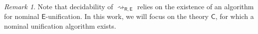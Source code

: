 \documentclass[submission,copyright,creativecommons]{eptcs}
\newcommand{\daniele}[1]{\textcolor{cyan}{#1}}
\newcommand{\caleq}{\approx_{\alpha,\theory{C}}}
\newcommand{\enarrow}[1]{\rightsquigarrow_{\theory{#1}}}
\newcommand{\alert}[1]{\textcolor{red}{#1}}
\newcommand{\theory}[1]{\ensuremath{\mathsf{#1}}}
\theoremstyle{plain}
\theoremstyle{definition}
\newtheorem{example}{Example}[section]
\theoremstyle{remark}
\newtheorem{remark}[theorem]{Remark}
\begin{document}
\begin{remark} Note that decidability of $\rightsquigarrow_\theory{R,E}$ relies on the existence of an algorithm for nominal \theory{E}-unification. 
In this work, we will focus  on the theory \theory{C}, for which a nominal unification algorithm exists. %

\end{remark}








    


\end{document}
